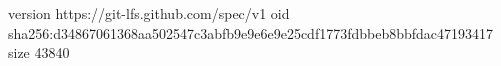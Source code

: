version https://git-lfs.github.com/spec/v1
oid sha256:d34867061368aa502547c3abfb9e9e6e9e25cdf1773fdbbeb8bbfdac47193417
size 43840
